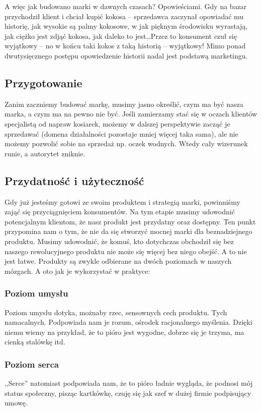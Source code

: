 \documentclass [a4paper, 11pt]{article}
\begin{document}
A więc jak budowano marki w dawnych czasach? Opowieściami. \cite{wyklad2} Gdy na bazar przychodził klient i chciał kupić kokosa -- sprzedawca zaczynał opowiadać mu historię, jak wysokie są palmy kokosowe, w jak pięknym środowisku wyrastają, jak ciężko jest zdjąć kokosa, jak daleko to jest\dots Przez to konsument czuł się wyjątkowy -- no w końcu taki kokos z taką historią -- wyjątkowy! Mimo ponad dwutysięcznego postępu opowiedzenie historii nadal jest podstawą marketingu.

\subsection{Przygotowanie}
Zanim zaczniemy budować markę, musimy jasno określić, czym ma być nasza marka, a czym ma na pewno nie być. \cite[s.~18]{tkaczykzakamarki} Jeśli zamierzamy stać się w oczach klientów specjalistą od napraw kosiarek, możemy w dalszej perspektywie zacząć je sprzedawać (domena działalności pozostaje mniej więcej taka sama), ale nie możemy pozwolić sobie na sprzedaż np. oczek wodnych. Wtedy cały wizerunek runie, a autorytet zniknie. \cite{wyklad2}
\subsection{Przydatność i użyteczność}
Gdy już jesteśmy gotowi ze swoim produktem i strategią marki, powinniśmy zająć się przyciągnięciem konsumentów. \cite{kall, tkaczykzakamarki} Na tym etapie musimy udowodnić potencjalnym klientom, że nasz produkt jest przydatny oraz dostępny. Ten punkt przypomina nam o tym, że nie da się stworzyć mocnej marki dla beznadziejnego produktu. Musimy udowodnić, że komuś, kto dotychczas obchodził się bez naszego rewolucyjnego produktu nie może się więcej bez niego obejść. A to nie jest łatwe. \cite[s.~109]{pogorzelski} Produkty są zwykle odbierane na dwóch poziomach w naszych mózgach. A oto jak je wykorzystać w praktyce:
\subsubsection{Poziom umysłu}
Poziom umysłu dotyka, możnaby rzec, sensownych cech produktu. Tych namacalnych. Podpowiada nam je rozum, ośrodek racjonalnego myślenia. Dzięki niemu wiemy na przykład, że to pióro jest wygodne, dobrze się je trzyma, ma cienką stalówkę itd.
\subsubsection{Poziom serca}
,,Serce'' natomiast podpowiada nam, że to pióro ładnie wygląda, że podnosi mój status społeczny, pisząc kartkówkę, czuję się jak szef w dużej firmie podpisujący umowę.
\end{document}
